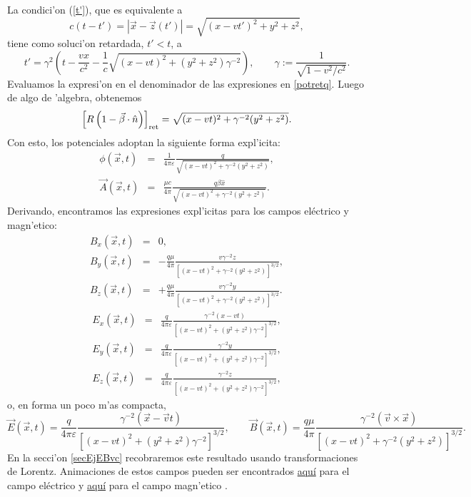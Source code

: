La condici'on (\ref{t'}), que es equivalente a
\begin{equation}
c(t-t')=\left|\vec{x}-\vec{z}(t')\right|=\sqrt{(x-vt')^2+y^2+z^2},
\end{equation}
tiene como soluci'on retardada, $t'<t$, a
\begin{equation}
t'=\gamma^2\left( t-\frac{vx}{c^2}-\frac{1}{c}\sqrt{(x-vt)^2+
(y^2+z^2)\gamma^{-2}}\right) , \qquad \gamma:=\frac{1}{\sqrt{1-v^2/c^2}}.
\end{equation}
Evaluamos la expresi'on en el denominador de las expresiones en \eqref{potretq}. Luego de algo de 'algebra, obtenemos
\begin{equation}
\left[ R\left(1-\vec{\beta}\cdot\hat{n}\right)\right]_{\rm ret}=\sqrt{(x-vt)^2+  \gamma^{-2}(y^2+z^2)}.
\end{equation}
Con esto, los potenciales adoptan la siguiente forma expl'icita:
\begin{eqnarray}
\phi(\vec{x},t)&=&\frac{1}{4\pi\varepsilon}\frac{q}{\sqrt{(x-vt)^2+ \gamma^{-2}(y^2+z^2)}} ,\\
\vec{A}(\vec{x},t)&=&\frac{\mu c}{4\pi} \frac{q\beta\hat{x}}{\sqrt{(x-vt)^2+
\gamma^{-2}(y^2+z^2)}}.
\end{eqnarray}
Derivando, encontramos las expresiones expl'icitas para los campos eléctrico y magn'etico:
\begin{eqnarray}
B_x(\vec{x},t)&=&0, \\
B_y(\vec{x},t)&=&-\frac{q\mu}{4\pi}\frac{v\gamma^{-2}z}{\left[ (x-vt)^2+
\gamma^{-2}(y^2+z^2)\right]^{3/2}}, \\
B_z(\vec{x},t)&=&+\frac{q\mu}{4\pi}\frac{v\gamma^{-2}y}{\left[(x-vt)^2+
\gamma^{-2}(y^2+z^2)\right]^{3/2}}.
\end{eqnarray}
\begin{eqnarray}
E_x(\vec{x},t)&=&\frac{q}{4\pi\varepsilon}\frac{\gamma^{-2}\left( x-vt\right) }{\left[ (x-vt)^2+
(y^2+z^2)\gamma^{-2}\right] ^{3/2}}, \\
E_y(\vec{x},t)&=&\frac{q}{4\pi\varepsilon}\frac{\gamma^{-2}y}{\left[ (x-vt)^2+
(y^2+z^2)\gamma^{-2}\right] ^{3/2}},\\
E_z(\vec{x},t)&=&\frac{q}{4\pi\varepsilon}\frac{\gamma^{-2}z }{\left[ (x-vt)^2+
(y^2+z^2)\gamma^{-2}\right]
^{3/2}},
\end{eqnarray}
o, en forma un poco m'as compacta,
\begin{equation}\label{EBqvconst}
\vec{E}(\vec{x},t)=\frac{q}{4\pi\varepsilon}\frac{\gamma^{-2}\left(\vec{x}-\vec{v}t\right)}{\left[(x-vt)^2+ (y^2+z^2)\gamma^{-2}\right] ^{3/2}},  \qquad
\vec{B}(\vec{x},t)=\frac{q\mu}{4\pi}\frac{\gamma^{-2}(\vec{v}\times\vec{x})}{\left[(x-vt)^2+\gamma^{-2}(y^2+z^2)\right]^{3/2}}.
\end{equation}
En la secci'on \ref{secEjEBvc} recobraremos este resultado usando transformaciones de Lorentz. Animaciones de estos campos pueden ser encontrados \href{http://ocw.mit.edu/ans7870/8/8.02T/f04/visualizations/electrostatics/04-MovingChargePosElec/04-MovChrgPosElec_f223_320.html}{aqu\'i} para el campo eléctrico y \href{http://ocw.mit.edu/ans7870/8/8.02T/f04/visualizations/magnetostatics/01-MovingChargePosMag/01-MovChrgMagPos_f223_320.html}{aqu\'i} para el campo magn'etico \cite{MIT}.


